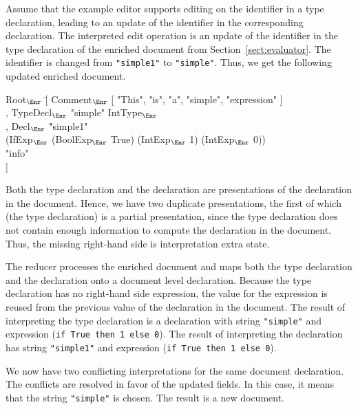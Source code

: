 Assume that the example editor supports editing on the identifier in a type declaration, leading to an update of the identifier in the corresponding declaration. 
The interpreted edit operation is an update of the identifier in the type declaration of the enriched document from Section~\ref{sect:evaluator}. The identifier is changed from \verb|"simple1"| to \verb|"simple"|. Thus, we get the following updated enriched document.

\small \ttfamily
\begin{tabbing}
Root$_{\Enr}$ \= [ Comment$_{\Enr}$ [ "This", "is", "a", "simple", "expression" ]\\
       \> , TypeDecl$_{\Enr}$ "simple" IntType$_{\Enr}$\\
       \> , Decl$_{\Enr}$ \= "simple1"\\
       \>                       \> (IfExp$_{\Enr}$ (BoolExp$_{\Enr}$ True) (IntExp$_{\Enr}$ 1) (IntExp$_{\Enr}$ 0)) \\
       \>                       \> "info"\\
       \> ] 
\end{tabbing}
\rmfamily \normalsize

Both the type declaration and the declaration are presentations of the declaration in the document. Hence, we have two duplicate presentations, the first of which (the type declaration) is a partial presentation, since the type declaration does not contain enough information to compute the declaration in the document. Thus, the missing right-hand side is interpretation extra state.

The reducer processes the enriched document and maps both the type declaration and the declaration onto a document level declaration. Because the type declaration has no right-hand side expression, the value for the expression is reused from the previous value of the declaration in the document. The result of interpreting the type declaration is a declaration with string 
\verb|"simple"| and expression (\verb|if True then 1 else 0|). The result of interpreting the declaration has string \verb|"simple1"| and expression (\verb|if True then 1 else 0|).

We now have two conflicting interpretations for the same document declaration. The conflicts are resolved in favor of the updated fields. In this case, it means that the string \verb|"simple"| is chosen. The result is a new document.

